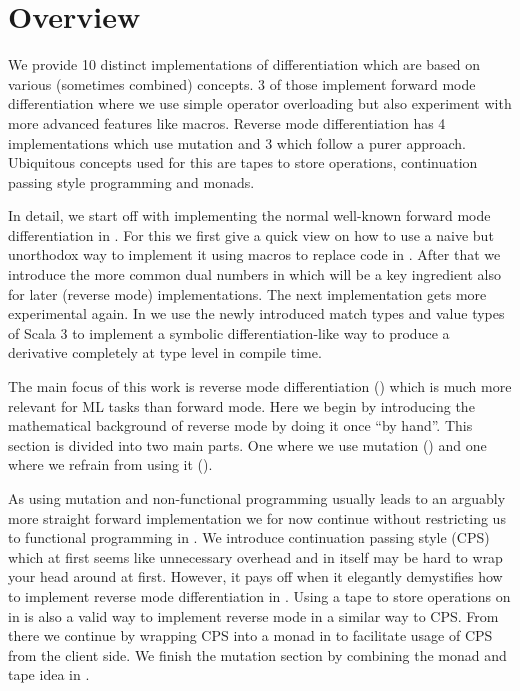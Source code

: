 \section{Overview}
We provide 10 distinct implementations of differentiation which are based on various (sometimes combined) concepts. 3 of those implement forward mode differentiation where we use simple operator overloading but also experiment with more advanced features like macros. Reverse mode differentiation has 4 implementations which use mutation and 3 which follow a purer approach. Ubiquitous concepts used for this are tapes to store operations, continuation passing style programming and monads.

In detail, we start off with implementing the normal well-known forward mode differentiation in . For this we first give a quick view on how to use a naive but unorthodox way to implement it using macros to replace code in . After that we introduce the more common dual numbers in  which will be a key ingredient also for later (reverse mode) implementations. The next implementation gets more experimental again. In  we use the newly introduced match types and value types of Scala 3 to implement a symbolic differentiation-like way to produce a derivative completely at type level in compile time.

The main focus of this work is reverse mode differentiation () which is much more relevant for ML tasks than forward mode. Here we begin by introducing the mathematical background of reverse mode by doing it once ``by hand''. This section is divided into two main parts. One where we use mutation () and one where we refrain from using it ().

As using mutation and non-functional programming usually leads to an arguably more straight forward implementation we for now continue without restricting us to functional programming in . We introduce continuation passing style (CPS) which at first seems like unnecessary overhead and in itself may be hard to wrap your head around at first. However, it pays off when it elegantly demystifies how to implement reverse mode differentiation in . Using a tape to store operations on in  is also a valid way to implement reverse mode in a similar way to CPS. From there we continue by wrapping CPS into a monad in  to facilitate usage of CPS from the client side. We finish the mutation section by combining the monad and tape idea in .

